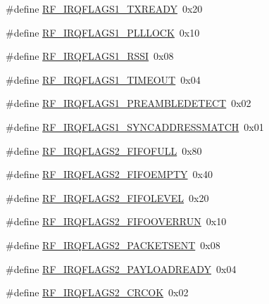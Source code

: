 \begin{DoxyCompactItemize}
\item 
\#define \mbox{\hyperlink{sx1276_regs-_fsk_8h_a465d49e932f278f59902789e70a3c713}{R\+F\+\_\+\+I\+R\+Q\+F\+L\+A\+G\+S1\+\_\+\+T\+X\+R\+E\+A\+DY}}~0x20
\item 
\#define \mbox{\hyperlink{sx1276_regs-_fsk_8h_afea7644a493f829a930c6a4f9bc7acee}{R\+F\+\_\+\+I\+R\+Q\+F\+L\+A\+G\+S1\+\_\+\+P\+L\+L\+L\+O\+CK}}~0x10
\item 
\#define \mbox{\hyperlink{sx1276_regs-_fsk_8h_acddf4bcd9ff43eac1edf8aa1e4f6c7ad}{R\+F\+\_\+\+I\+R\+Q\+F\+L\+A\+G\+S1\+\_\+\+R\+S\+SI}}~0x08
\item 
\#define \mbox{\hyperlink{sx1276_regs-_fsk_8h_ac8d3e1c751fe2a0ba644dab36cf01d41}{R\+F\+\_\+\+I\+R\+Q\+F\+L\+A\+G\+S1\+\_\+\+T\+I\+M\+E\+O\+UT}}~0x04
\item 
\#define \mbox{\hyperlink{sx1276_regs-_fsk_8h_af93b6a2656990eaaac6467e5b7bb900e}{R\+F\+\_\+\+I\+R\+Q\+F\+L\+A\+G\+S1\+\_\+\+P\+R\+E\+A\+M\+B\+L\+E\+D\+E\+T\+E\+CT}}~0x02
\item 
\#define \mbox{\hyperlink{sx1276_regs-_fsk_8h_a9773a75aa15a6e081ee08400d0c99bdc}{R\+F\+\_\+\+I\+R\+Q\+F\+L\+A\+G\+S1\+\_\+\+S\+Y\+N\+C\+A\+D\+D\+R\+E\+S\+S\+M\+A\+T\+CH}}~0x01
\item 
\#define \mbox{\hyperlink{sx1276_regs-_fsk_8h_abd1e80863cab37648e006f1b10c8a099}{R\+F\+\_\+\+I\+R\+Q\+F\+L\+A\+G\+S2\+\_\+\+F\+I\+F\+O\+F\+U\+LL}}~0x80
\item 
\#define \mbox{\hyperlink{sx1276_regs-_fsk_8h_a3dab8f9ed1df7682ad585cb7d88fb9d6}{R\+F\+\_\+\+I\+R\+Q\+F\+L\+A\+G\+S2\+\_\+\+F\+I\+F\+O\+E\+M\+P\+TY}}~0x40
\item 
\#define \mbox{\hyperlink{sx1276_regs-_fsk_8h_a7740115745a3a932a9b7af0560632e42}{R\+F\+\_\+\+I\+R\+Q\+F\+L\+A\+G\+S2\+\_\+\+F\+I\+F\+O\+L\+E\+V\+EL}}~0x20
\item 
\#define \mbox{\hyperlink{sx1276_regs-_fsk_8h_ab8c3186a58e855c916590aafbef08cc6}{R\+F\+\_\+\+I\+R\+Q\+F\+L\+A\+G\+S2\+\_\+\+F\+I\+F\+O\+O\+V\+E\+R\+R\+UN}}~0x10
\item 
\#define \mbox{\hyperlink{sx1276_regs-_fsk_8h_ab17c87d7c87bb0cf9eae4db77b2902c9}{R\+F\+\_\+\+I\+R\+Q\+F\+L\+A\+G\+S2\+\_\+\+P\+A\+C\+K\+E\+T\+S\+E\+NT}}~0x08
\item 
\#define \mbox{\hyperlink{sx1276_regs-_fsk_8h_a31da28dd399ab411a7f35f1c3d5295a8}{R\+F\+\_\+\+I\+R\+Q\+F\+L\+A\+G\+S2\+\_\+\+P\+A\+Y\+L\+O\+A\+D\+R\+E\+A\+DY}}~0x04
\item 
\#define \mbox{\hyperlink{sx1276_regs-_fsk_8h_a55a4b43de7fb4852a6ffe0cf6eee98f7}{R\+F\+\_\+\+I\+R\+Q\+F\+L\+A\+G\+S2\+\_\+\+C\+R\+C\+OK}}~0x02

\end{DoxyCompactItemize}

